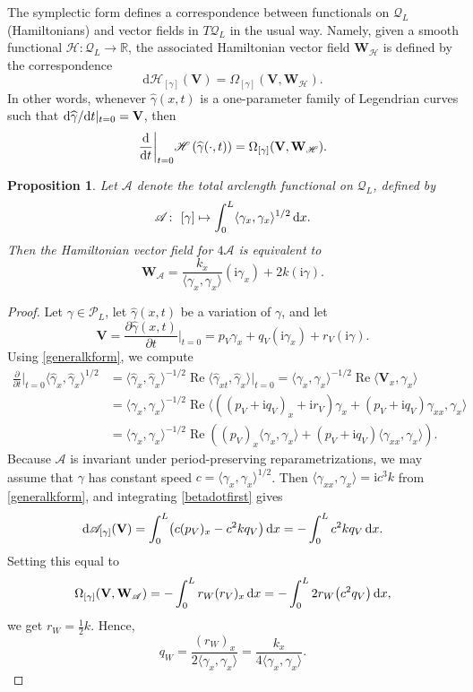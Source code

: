 \documentclass[pdftex]{sigma}
\newcommand\Leg{ {\mathcal P}} %
\newcommand\Legq{\mathcal Q}
\newcommand\kk{k} %
\def\ri{\mathrm{i}}
\newcommand\VV{\mathbf V}
\newcommand\VW{\mathbf W}
\newcommand\funH{{\mathscr H}} %
\newcommand\funA{{\mathscr A}} %
\newcommand{\dx}{\,{\rm d}x}
\def\gam{\gamma} %
\def\di{\partial}
\def\R{\mathbb R}
\newcommand\gamf{\widehat{\gam}} %
\newcommand\bert{\big\vert}
\newcommand\rd{\mathrm{d}}
\renewcommand\Re{\operatorname{Re}}
\numberwithin{equation}{section}
\newtheorem{Proposition}[Theorem]{Proposition}
 { \theoremstyle{definition}
\newtheorem{Definition}[Theorem]{Definition}
\newtheorem{Note}[Theorem]{Note}
\newtheorem{Example}[Theorem]{Example}
\newtheorem{Remark}[Theorem]{Remark} }
\begin{document}
The symplectic form defines a correspondence between functionals on
$\Legq_L$ (Hamiltonians) and vector fields in $T \Legq_L$ in the usual way. Namely, given a smooth functional $\funH\colon \Legq_L \to \R$, the associated Hamiltonian vector field $\VW_\funH$ is defined by the correspondence
\[
\rd \funH_{[\gamma]} (\VV)=\Omega_{[\gamma]}(\VV, \VW_\funH).
\]
In other words, whenever $\gamf(x,t)$ is a one-parameter family of Legendrian curves such that ${\rm d}\gamf/{\rm d}t\vert_{t=0} = \VV$, then
\[\dfrac{{\rm d}}{{\rm d}t}\bigg\vert_{t=0} \funH \left( \gamf(\cdot, t)\right) = \Omega_{[\gamma]}(\VV, \VW_\funH).\]

\begin{Proposition}\label{hamlength} Let $\funA$ denote the total arclength functional on $\Legq_L$, defined by
\[\funA\colon \ [\gam] \mapsto \int_0^L \langle \gam_x ,\gam_x \rangle^{1/2} \dx.\]
Then the Hamiltonian vector field for $4\funA$ is equivalent to
\[
\VW_\funA=\dfrac{ \kk_x}{\langle \gam_x, \gam_x\rangle} (\ri \gam_x) + 2 \kk(\ri \gam).
\]
\end{Proposition}

\begin{proof}
Let $\gam \in \Leg_L$, let $\gamf(x,t)$ be a variation of $\gam$, and let
\begin{equation}\label{VVdef}
\VV = \dfrac{\di \gamf(x,t)}{\di t}\Big|_{t=0} = p_V\gam_x + q_V (\ri\gam_x) + r_V (\ri \gam).
\end{equation}
Using \eqref{generalkform}, we compute
\begin{align}
\frac{\di }{\di t}\bigg|_{t=0} \bigl\langle \gamf_x , \gamf_x \bigr\rangle^{1/2}
& =\bigl\langle \gamf_x , \gamf_x \bigr\rangle^{-1/2} \Re \bigl\langle \gamf_{xt} , \gamf_x \bigr\rangle \bert_{t=0}
= \langle \gam_x, \gam_x \rangle^{-1/2} \Re\langle \VV_x, \gam_x \rangle \nonumber\\[-3pt]
&=\langle \gam_x, \gam_x \rangle^{-1/2} \Re\langle \left((p_V+\ri q_V)_x + \ri r_V\right) \gam_x + (p_V +\ri q_V) \gam_{xx}, \gam_x\rangle \nonumber\\
&=\langle \gam_x, \gam_x \rangle^{-1/2}\Re\left( (p_V)_x \langle \gam_x, \gam_x \rangle + (p_V +\ri q_V) \langle \gam_{xx}, \gam_x\rangle \right).
\label{betadotfirst}
\end{align}
Because $\funA$ is invariant under period-preserving reparametrizations, we may assume that $\gam$ has constant speed $c=\langle \gam_x, \gam_x \rangle^{1/2}$.
Then $\langle \gam_{xx}, \gam_x\rangle = \ri c^3 \kk$ from \eqref{generalkform}, and integrating \eqref{betadotfirst} gives
\[
\rd \funA_{[\gamma]} (\VV) = \int_0^L \bigl(c (p_V)_x -c^2 \kk q_V\bigr)\dx=-\int_0^L c^2 \kk q_V \dx.
\]
Setting this equal to
\[
\Omega_{[\gamma]}(\VV, \VW_\funA)=-\int_0^L r_W (r_V)_x \, {\rm d}x=-\int_0^L 2 r_W \bigl(c^2q_V \bigr)\, {\rm d}x,
\] we get
$r_W=\tfrac12 \kk$. Hence,
\[
q_W = \frac{(r_W)_x}{2 \langle \gam_x, \gam_x\rangle} = \frac{\kk_x}{4 \langle \gam_x, \gam_x\rangle}.\tag*{\qed}
\]\renewcommand{\qed}{}
\end{proof}
\end{document}
